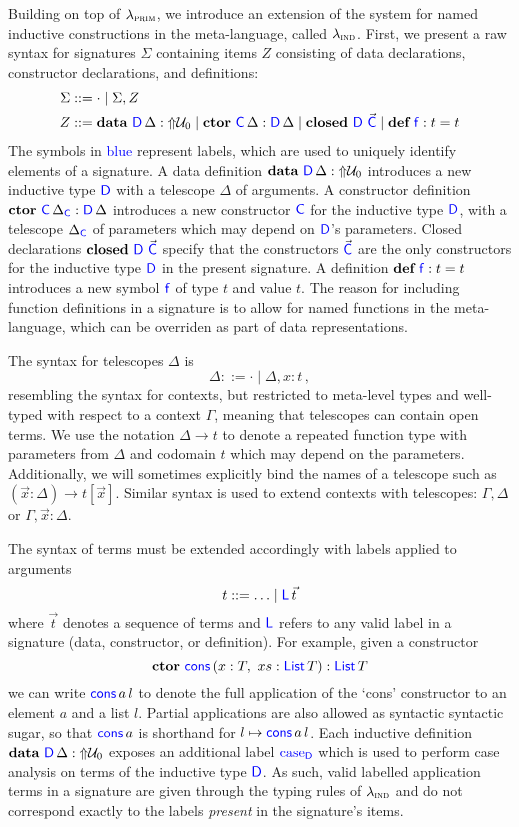 Building on top of $\lambda_{\textsc{prim}}$, we introduce an extension of the system for
named inductive constructions in the meta-language, called $\lambda_{\textsc{ind}}$. First,
we present a raw syntax for signatures $\Sigma$ containing items $Z$ consisting
of data declarations, constructor declarations, and definitions:
\begin{align*}
  \Sigma & ::= \cdot \mid \Sigma, Z                                                                                          \\
  Z      & ::= \textbf{data} \ {\color{blue}{\mathsf{D}}} \, {\Delta} : \text{$\Uparrow$}{\mathcal{U}_0} \mid \textbf{ctor} \ {\color{blue}{\mathsf{C}}} \, {\Delta} : {\color{blue}{\mathsf{D}}}\, {\Delta} \mid \textbf{closed}\ {\color{blue}{\mathsf{D}}} \ \vec{{\color{blue}{\mathsf{C}}}} \mid \textbf{def} \ {\color{blue}{\mathsf{f}}} : {t} = {t}
\end{align*}
The symbols in \textcolor{blue}{blue} represent labels, which are used to
uniquely identify elements of a signature.
A data definition $\textbf{data} \ {\color{blue}{\mathsf{D}}} \, {\Delta} : \text{$\Uparrow$}{\mathcal{U}_0}$ introduces a new inductive type ${\color{blue}{\mathsf{D}}}$
with a telescope $\Delta$ of arguments. A constructor definition
$\textbf{ctor} \ {\color{blue}{\mathsf{C}}} \, {\Delta_{{\color{blue}{\mathsf{C}}}}} : {\color{blue}{\mathsf{D}}}\, {\Delta}$ introduces a new constructor ${\color{blue}{\mathsf{C}}}$ for
the inductive type ${\color{blue}{\mathsf{D}}}$, with a telescope $\Delta_{{\color{blue}{\mathsf{C}}}}$ of parameters
which may depend on ${\color{blue}{\mathsf{D}}}$'s parameters. Closed declarations $\textbf{closed}\ {\color{blue}{\mathsf{D}}} \ \vec{{\color{blue}{\mathsf{C}}}}$ specify that the
constructors $\vec{{\color{blue}{\mathsf{C}}}}$ are the only constructors for the inductive type
${\color{blue}{\mathsf{D}}}$ in the present signature. A definition
$\textbf{def} \ {\color{blue}{\mathsf{f}}} : {t} = {t}$ introduces a new symbol ${\color{blue}{\mathsf{f}}}$ of type $t$ and value
$t$.
The reason for including function definitions in a signature is to allow for
named functions in the meta-language, which can be overriden as part of data
representations.

The syntax for telescopes $\Delta$ is
\[
  \Delta ::= \cdot \mid \Delta, x : t \,,
\]
resembling the syntax for contexts, but restricted to meta-level types and
well-typed with respect to a context $\Gamma$, meaning that telescopes can
contain open terms. We use the notation $\Delta \to t$ to denote a repeated
function type with parameters from $\Delta$ and codomain $t$ which may depend
on the parameters. Additionally, we will sometimes explicitly bind the names of
a telescope such as $(\vec{x} : \Delta) \to t[\vec{x}]$. Similar syntax is used
to extend contexts with telescopes: $\Gamma, \Delta$ or $\Gamma, \vec{x} :
  \Delta$.

The syntax of terms must be extended accordingly with labels applied to
arguments
\[
  t ::= \ldots \mid {\ensuremath{\color{blue}{\mathsf{L}}}} \, \vec{t}
\]
where $\vec{t}$ denotes a sequence of terms and ${\color{blue}{\mathsf{L}}}$ refers to any valid
label in a signature (data, constructor, or definition). For example, given a
constructor
\[
  \textbf{ctor} \ {\color{blue}{\mathsf{cons}}} \, {(x : T,\ xs : {\color{blue}{\mathsf{List}}}\, T)} : {\color{blue}{\mathsf{{\ensuremath{\color{blue}{\mathsf{List}}}}}}}\, {T}
\]
we can write ${\color{blue}{\mathsf{cons}}} \, a \, l$ to denote the full application of the
`cons' constructor to an element $a$ and a list $l$. Partial applications are
also allowed as syntactic syntactic sugar, so that ${\color{blue}{\mathsf{cons}}} \, a$ is
shorthand for $l \mapsto {\ensuremath{\color{blue}{\mathsf{cons}}}}\,a\,l$. Each inductive definition
$\textbf{data} \ {\color{blue}{\mathsf{D}}} \, {\Delta} : \text{$\Uparrow$}{\mathcal{U}_0}$ exposes an additional label ${\color{blue}{\mathsf{\textrm{case}_{D}}}}$ which is used to
perform case analysis on terms of the inductive type ${\color{blue}{\mathsf{D}}}$. As such, valid
labelled application terms in a signature are given through the typing rules of
$\lambda_{\textsc{ind}}$ and do not correspond exactly to the labels \emph{present} in the
signature's items.

